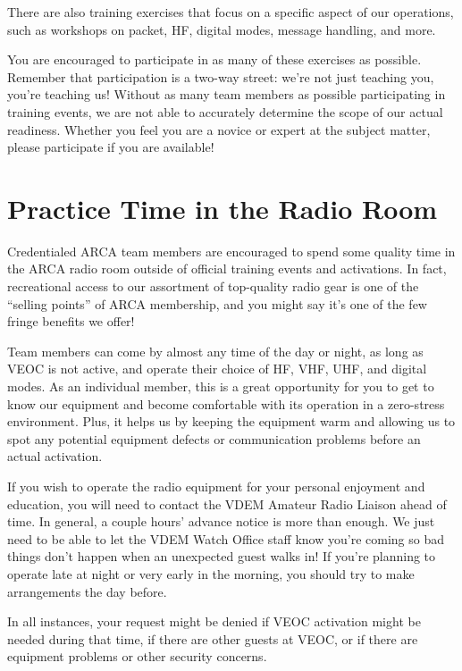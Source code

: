 \documentclass[pdflatex,letterpaper,twoside,12pt]{book}
\begin{document}
There are also training exercises that focus on a specific aspect of our operations, such as workshops on packet, HF, digital modes, message handling, and more.

You are encouraged to participate in as many of these exercises as possible.  Remember that participation is a two-way street:  we're not just teaching you, you're teaching us!  Without as many team members as possible participating in training events, we are not able to accurately determine the scope of our actual readiness.  Whether you feel you are a novice or expert at the subject matter, please participate if you are available!


\section{Practice Time in the Radio Room}

Credentialed ARCA team members are encouraged to spend some quality time in the ARCA radio room outside of official training events and activations.  In fact, recreational access to our assortment of top-quality radio gear is one of the ``selling points'' of ARCA membership, and you might say it's one of the few fringe benefits we offer!

Team members can come by almost any time of the day or night, as long as VEOC is not active, and operate their choice of HF, VHF, UHF, and digital modes.  As an individual member, this is a great opportunity for you to get to know our equipment and become comfortable with its operation in a zero-stress environment.  Plus, it helps us by keeping the equipment warm and allowing us to spot any potential equipment defects or communication problems before an actual activation.

If you wish to operate the radio equipment for your personal enjoyment and education, you will need to contact the VDEM Amateur Radio Liaison ahead of time.  In general, a couple hours' advance notice is more than enough.  We just need to be able to let the VDEM Watch Office staff know you're coming so bad things don't happen when an unexpected guest walks in!  If you're planning to operate late at night or very early in the morning, you should try to make arrangements the day before.

In all instances, your request might be denied if VEOC activation might be needed during that time, if there are other guests at VEOC, or if there are equipment problems or other security concerns.
\end{document}
